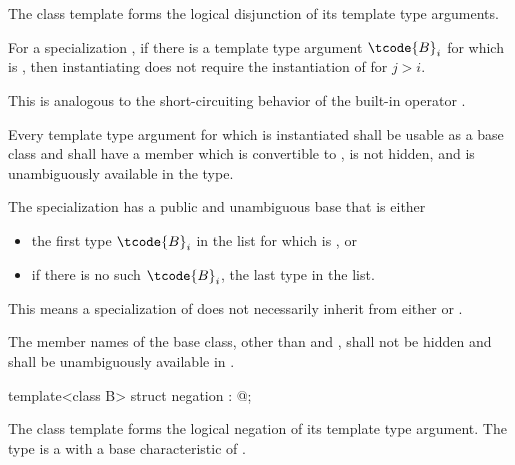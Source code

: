 \begin{itemdescr}
\pnum
The class template 
forms the logical disjunction of its template type arguments.

\pnum
For a specialization ,
if there is a template type argument $\tcode{B}_{i}$
for which  is ,
then instantiating 
does not require the instantiation of  for $j > i$.
\begin{note}
This is analogous to the short-circuiting behavior of
the built-in operator \tcode{||}.
\end{note}

\pnum
Every template type argument
for which  is instantiated
shall be usable as a base class and
shall have a member  which
is convertible to ,
is not hidden, and
is unambiguously available in the type.

\pnum
The specialization 
has a public and unambiguous base that is either
\begin{itemize}
\item the first type $\tcode{B}_{i}$ in the list 
for which  is , or
\item if there is no such $\tcode{B}_{i}$, the last type in the list.
\end{itemize}
\begin{note}
This means a specialization of 
does not necessarily inherit from
either  or .
\end{note}

\pnum
The member names of the base class,
other than  and ,
shall not be hidden and shall be unambiguously available in .
\end{itemdescr}

\begin{indexed}{}
\begin{itemdecl}
template<class B> struct negation : @\seebelow@ { };
\end{itemdecl}
\end{indexed}

\begin{itemdescr}
\pnum
The class template 
forms the logical negation of its template type argument.
The type 
is a  with a base characteristic of .
\end{itemdescr}

